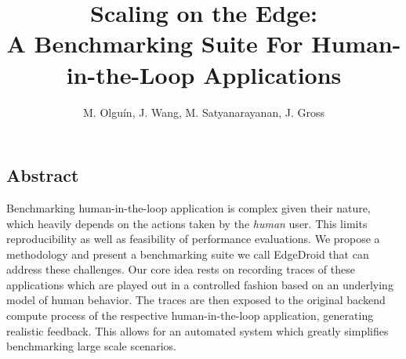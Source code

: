 \documentclass[portrait, a1]{KTHEEposter}
\begin{document}
    
    \title{\LARGE\bfseries Scaling on the Edge:\\A Benchmarking Suite For Human-in-the-Loop Applications}
    
    \author{\Large M. Olguín, J. Wang, M. Satyanarayanan, J. Gross}
    \maketitle
    
    \begin{pcolumns}[3]
        \begin{pcolumn}[2]
            \begin{pframe}[.67]
                \section{Abstract}
                Benchmarking human-in-the-loop application is complex given their nature, which heavily depends on the actions taken by the \emph{human} user.
                This limits reproducibility as well as feasibility of performance evaluations.
                We propose a methodology and present a benchmarking suite we call EdgeDroid  that can address these challenges.
                Our core idea rests on recording traces of these applications which are played out in a controlled fashion based on an underlying model of human behavior.
                The traces are then exposed to the original backend compute process of the respective human-in-the-loop application, generating realistic feedback.
                This allows for an automated system which greatly simplifies benchmarking large scale scenarios.
            \end{pframe}
            \begin{pframe}[1.33]

\end{pframe}
\end{pcolumn}
\end{pcolumns}
\end{document}
